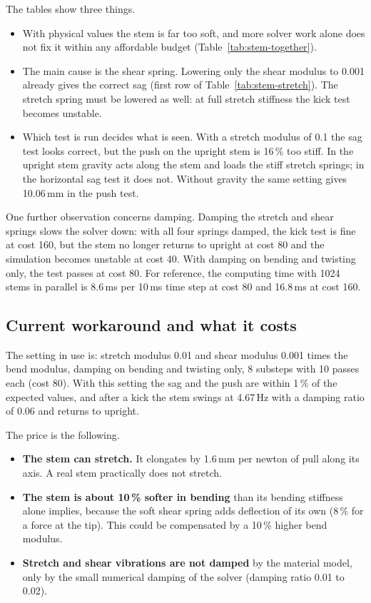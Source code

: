 \documentclass[11pt,a4paper]{article}
\begin{document}
The tables show three things.
\begin{itemize}
  \item With physical values the stem is far too soft, and more solver work alone does not fix it within
        any affordable budget (Table~\ref{tab:stem-together}).
  \item The main cause is the shear spring. Lowering only the shear modulus to 0.001 already gives the
        correct sag (first row of Table~\ref{tab:stem-stretch}). The stretch spring must be lowered as well: at full stretch
        stiffness the kick test becomes unstable.
  \item Which test is run decides what is seen. With a stretch modulus of 0.1 the sag test looks correct,
        but the push on the upright stem is 16\,\% too stiff. In the upright stem gravity acts along the
        stem and loads the stiff stretch springs; in the horizontal sag test it does not. Without gravity
        the same setting gives 10.06\,mm in the push test.
\end{itemize}

One further observation concerns damping. Damping the stretch and shear springs slows the solver down: with
all four springs damped, the kick test is fine at cost 160, but the stem no longer returns to upright at
cost 80 and the simulation becomes unstable at cost 40. With damping on bending and twisting only, the
test passes at cost 80. For reference, the computing time with 1024 stems in parallel is 8.6\,ms per
10\,ms time step at cost 80 and 16.8\,ms at cost 160.

\subsection{Current workaround and what it costs}

The setting in use is: stretch modulus 0.01 and shear modulus 0.001 times the bend modulus, damping on
bending and twisting only, 8 substeps with 10 passes each (cost 80). With this setting the sag and the push
are within 1\,\% of the expected values, and after a kick the stem swings at 4.67\,Hz with a damping ratio
of 0.06 and returns to upright.

The price is the following.
\begin{itemize}
  \item \textbf{The stem can stretch.} It elongates by 1.6\,mm per newton of pull along its axis. A real
        stem practically does not stretch.
  \item \textbf{The stem is about 10\,\% softer in bending} than its bending stiffness alone implies,
        because the soft shear spring adds deflection of its own (8\,\% for a force at the tip). This
        could be compensated by a 10\,\% higher bend modulus.
  \item \textbf{Stretch and shear vibrations are not damped} by the material model, only by the small
        numerical damping of the solver (damping ratio 0.01 to 0.02).
\end{itemize}
\end{document}
